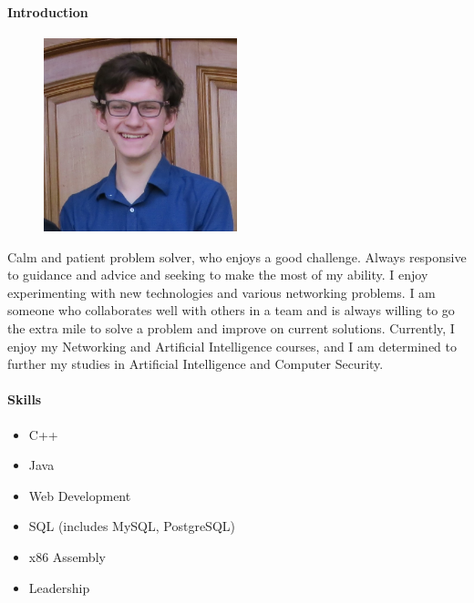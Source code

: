 \documentclass{article}
\begin{document}
        \paragraph{Introduction}
        \begin{figure}
              \begin{center}
                \vspace{-0.75cm}
                \includegraphics[width=0.5\textwidth]{img/stephan.jpg}
              \end{center}
            \end{figure}
            Calm and patient problem solver, who enjoys a good challenge. Always responsive to guidance and advice and seeking to make the most of my ability. I enjoy experimenting with new technologies and various networking problems. I am someone who collaborates well with others in a team and is always willing to go the extra mile to solve a problem and improve on current solutions. Currently, I enjoy my Networking and Artificial Intelligence courses, and I am determined to further my studies in Artificial Intelligence and Computer Security.
            
        \paragraph{Skills}
            \begin{itemize}
                \item C++
                \item Java
                \item Web Development
                \item SQL (includes MySQL, PostgreSQL)
                \item x86 Assembly
                \item Leadership
            \end{itemize}
            
\end{document}
